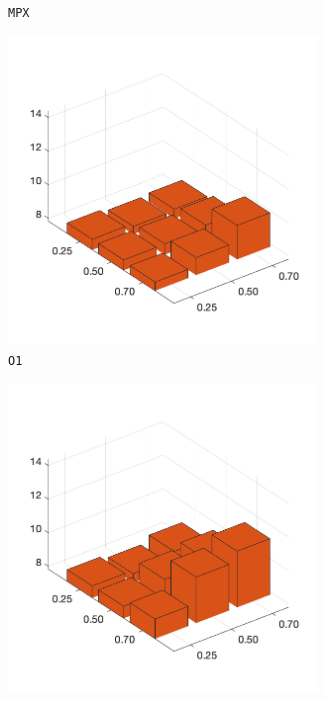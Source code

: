 \begin{figure}[H]
\begin{subfigure}[b]{0.25\textwidth}
		\caption{\texttt{MPX}}
		\label{fig:y}
    	\end{subfigure}
%
	\begin{subfigure}[b]{0.25\textwidth}
		\centering
		\includegraphics[width=0.9\textwidth]{crossover/min/cross_order_2.png}
		\caption{\texttt{O1}}
		\label{fig:z}
    	\end{subfigure}
%
	\begin{subfigure}[b]{0.25\textwidth}
		\centering
		\includegraphics[width=0.9\textwidth]{crossover/min/cross_order_based_2.png}

\end{subfigure}
\end{figure}
